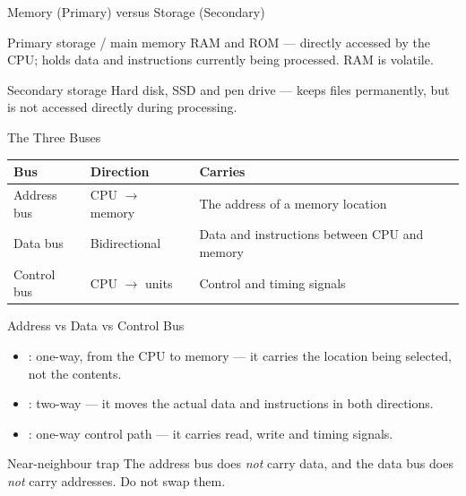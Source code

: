 \documentclass[aspectratio=169]{beamer}
\begin{document}
\begin{frame}{Memory (Primary) versus Storage (Secondary)}
  \begin{block}{Primary storage / main memory}
    RAM and ROM --- directly accessed by the CPU; holds data and instructions
    currently being processed. RAM is volatile.
  \end{block}
  \begin{alertblock}{Secondary storage}
    Hard disk, SSD and pen drive --- keeps files permanently, but is not
    accessed directly during processing.
  \end{alertblock}
  \vspace{0.2cm}
\end{frame}

\begin{frame}{The Three Buses}
  \begin{center}
    \begin{tabular}{p{} p{} p{}}
      \toprule
      \textbf{Bus} & \textbf{Direction} & \textbf{Carries} \\
      \midrule
      Address bus & CPU $\rightarrow$ memory & The address of a memory
      location \\
      Data bus & Bidirectional & Data and instructions between CPU and
      memory \\
      Control bus & CPU $\rightarrow$ units & Control and timing signals \\
      \bottomrule
    \end{tabular}
  \end{center}
  \vspace{0.3cm}
\end{frame}

\begin{frame}{Address vs Data vs Control Bus}
  \begin{itemize}
    \item {}: one-way, from the CPU to memory --- it carries
      the location being selected, not the contents.
    \item {}: two-way --- it moves the actual data and
      instructions in both directions.
    \item {}: one-way control path --- it carries read, write
      and timing signals.
    \end{itemize}
  \begin{alertblock}{Near-neighbour trap}
    The address bus does \emph{not} carry data, and the data bus does
    \emph{not} carry addresses. Do not swap them.
  \end{alertblock}
\end{frame}
\end{document}
